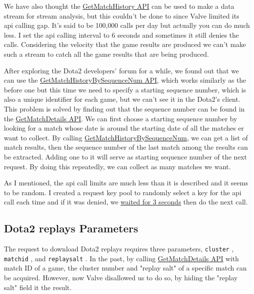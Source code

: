 \documentclass{article}
\newcommand{\codeinline}[1]{
    \texttt{#1}
}
\begin{document}
We have also thought the \href{https://wiki.teamfortress.com/wiki/WebAPI/GetMatchHistory}{GetMatchHistory API} can be used to make a data stream for stream analysis, but this couldn't be done to since Valve limited its api calling gap.
It's said to be 100,000 calls per day but actually you can do much less. I set the api calling interval to 6 seconds and sometimes it still denies the calls.
Considering the velocity that the game results are produced we can't make such a stream to catch all the game results that are being produced.

After exploring the Dota2 developers' forum for a while, we found out that we can use the \href{https://wiki.teamfortress.com/wiki/WebAPI/GetMatchHistoryBySequenceNum}{GetMatchHistoryBySequenceNum API}, which works similarly as the before one but this time we need to specify a starting sequence number, which is also a unique identifier for each game, but we can't see it in the Dota2's client.
This problem is solved by finding out that the sequence number can be found in the \href{https://wiki.teamfortress.com/wiki/WebAPI/GetMatchDetails}{GetMatchDetails API}.
We can first choose a starting sequence number by looking for a match whose date is around the starting date of all the matches er want to collect.
By calling \href{https://wiki.teamfortress.com/wiki/WebAPI/GetMatchHistoryBySequenceNum}{GetMatchHistoryBySequenceNum}, we can get a list of match results, then the sequence number of the last match among the results can be extracted. Adding one to it will serve as starting sequence number of the next request. By doing this repeatedly, we can collect as many matches we want.

As I mentioned, the api call limits are much less than it is described and it seems to be random. I created a request key pool to randomly select a key for the api call each time and if it was denied, we \href{https://github.com/Vopaaz/big-data-psg-lgd/blob/a9a285e0e29c0d9e56b41994875df830c7e7b51b/src/main/java/FetchStore/ValveAPI.java#L241-L249}{waited for 3 seconds} then do the next call.


\subsection{Dota2 replays Parameters}

The request to download Dota2 replays requires three parameters, \codeinline{cluster}, \codeinline{matchid}, and \codeinline{replaysalt}.
In the past, by calling \href{https://wiki.teamfortress.com/wiki/WebAPI/GetMatchDetails}{GetMatchDetails API} with match ID of a game, the cluster number and "replay salt" of a specific match can be acquired. However, now Valve disallowed us to do so, by hiding the "replay salt" field it the result.
\end{document}
